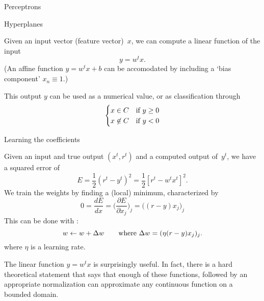 

 {Perceptrons}

 {Hyperplanes}

Given an input vector (feature vector)~$x$, we can compute a linear
function of the input
\[ y = w^tx. \]
(An affine function $y=w^tx+b$ can be accomodated by including a `bias
component' $x_n\equiv1$.)

This output $y$ can be used as a numerical value,
or as classification through
\[ 
\begin{cases}
  x\in C &\hbox{if $y\geq 0$}\\
  x\not\in C&\hbox{if $y<0$}\\
\end{cases}
\]

 {Learning the coefficients}

Given an input and true output $(x^t,r^t)$ and a computed output
of~$y^t$, we have a squared error of
\[ E = \frac12 (r^t-y^t)^2 = \frac12 \left[r^t- w^tx^t\right]^2. \]
We train the weights
by finding a (local) minimum, characterized by
\[ 0=\frac{d E}{d x} = \bigl( \frac{\partial E}{\partial x_j} \bigr)_j
    = \bigl( (r-y)x_j \bigr)_j \]
This can be done with :
\[ w\leftarrow w+\Delta w \qquad
    \hbox{where $\Delta w=( \eta(r-y)x_j )_j$}. \]
where $\eta$ is a learning rate.


The linear function $y=w^tx$ is surprisingly useful. In fact, there is
a hard theoretical statement that says that enough of these functions,
followed by an appropriate normalization can approximate any
continuous function on a bounded domain.

